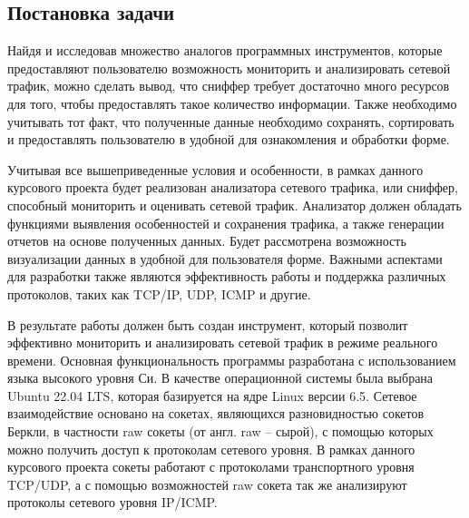 \subsection{Постановка задачи}

Найдя и исследовав множество аналогов программных инструментов,
которые предоставляют пользователю возможность мониторить и
анализировать сетевой трафик, можно сделать вывод, что сниффер требует
достаточно много ресурсов для того, чтобы предоставлять такое количество
информации. Также необходимо учитывать тот факт, что полученные данные 
необходимо сохранять, сортировать и предоставлять пользователю
в удобной для ознакомления и обработки форме.

Учитывая все вышеприведенные условия и особенности, в рамках данного
курсового проекта будет реализован анализатора сетевого трафика, или
сниффер, способный мониторить и оценивать сетевой трафик. Анализатор
должен обладать функциями выявления особенностей и сохранения трафика, 
а также генерации отчетов на основе полученных данных. 
Будет рассмотрена возможность визуализации данных в удобной для 
пользователя форме. Важными аспектами для разработки также являются 
эффективность работы и поддержка различных протоколов, таких как TCP/IP, UDP, ICMP и другие\cite{unix_man}.

В результате работы должен быть создан инструмент, который позволит
эффективно мониторить и анализировать сетевой трафик в режиме реального
времени. Основная функциональность программы разработана с
использованием языка высокого уровня Си. В качестве операционной системы
была выбрана Ubuntu 22.04 LTS, которая базируется на ядре Linux версии 6.5.
Сетевое взаимодействие основано на сокетах, являющихся разновидностью
сокетов Беркли, в частности raw сокеты (от англ. raw -- сырой), с помощью
которых можно получить доступ к протоколам сетевого уровня. В рамках
данного курсового проекта сокеты работают с протоколами транспортного
уровня TCP/UDP, а с помощью возможностей raw сокета так же анализируют
протоколы сетевого уровня IP/ICMP.
